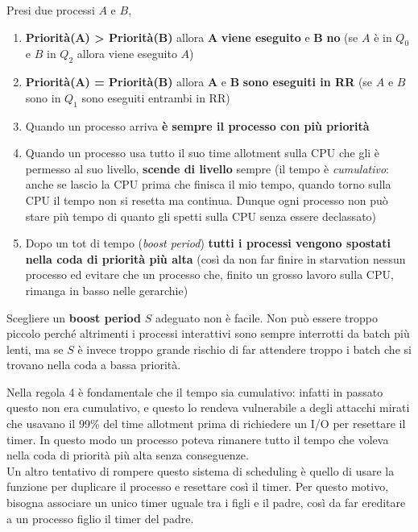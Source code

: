 \documentclass[11pt, a4paper, titlepage, oneside]{scrbook}
\begin{document}
\begin{Proprieta}
\label{prop-regole}
Presi due processi $A$ e $B$,
\begin{enumerate}
    \item \textbf{Priorità($\bm{A}$) > Priorità($\bm{B}$)} allora $\bm{A}$ \textbf{viene eseguito} e $\bm{B}$ \textbf{no} (se $A$ è in $Q_0$ e $B$ in $Q_2$ allora viene eseguito $A$)
    \item \textbf{Priorità($\bm{A}$) = Priorità($\bm{B}$)} allora $\bm{A}$ e $\bm{B}$ \textbf{sono eseguiti in RR} (se $A$ e $B$ sono in $Q_1$ sono eseguiti entrambi in RR)
    \item Quando un processo arriva \textbf{è sempre il processo con più priorità}
    \item Quando un processo usa tutto il suo time allotment sulla CPU che gli è permesso al suo livello, \textbf{scende di livello} sempre (il tempo è \textit{cumulativo}: anche se lascio la CPU prima che finisca il mio tempo, quando torno sulla CPU il tempo non si resetta ma continua. Dunque ogni processo non può stare più tempo di quanto gli spetti sulla CPU senza essere declassato)
    \item Dopo un tot di tempo (\textit{boost period}) \textbf{tutti i processi vengono spostati nella coda di priorità più alta} (così da non far finire in starvation nessun processo ed evitare che un processo che, finito un grosso lavoro sulla CPU, rimanga in basso nelle gerarchie)
\end{enumerate}
\end{Proprieta}

Scegliere un \textbf{boost period} $S$ adeguato non è facile. Non può essere troppo piccolo perché altrimenti i processi interattivi sono sempre interrotti da batch più lenti, ma se $S$ è invece troppo grande rischio di far attendere troppo i batch che si trovano nella coda a bassa priorità.

Nella regola 4 è fondamentale che il tempo sia cumulativo: infatti in passato questo non era cumulativo, e questo lo rendeva vulnerabile a degli attacchi mirati che usavano il 99\% del time allotment prima di richiedere un I/O per resettare il timer. In questo modo un processo poteva rimanere tutto il tempo che voleva nella coda di priorità più alta senza conseguenze. \\
Un altro tentativo di rompere questo sistema di scheduling è quello di usare la funzione  per duplicare il processo e resettare così il timer. Per questo motivo, bisogna associare un unico timer uguale tra i figli e il padre, così da far ereditare a un processo figlio il timer del padre.
\end{document}
